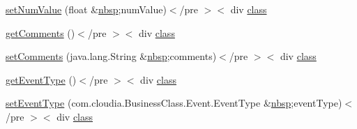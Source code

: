 \begin{DoxyCompactItemize}
\item 
\hyperlink{_event_8html_a67d82def639db0739032e4544a57afee}{set\-Num\-Value} (float \&\hyperlink{_tools_8html_aef915316f784c9063d942974538301a6}{nbsp};num\-Value)$<$/pre $>$$<$ div \hyperlink{_tools_8html_acf06f836132665ba8114f5a414c2403f}{class}
\item 
\hyperlink{_event_8html_a91fa52adf744ddd6011f742b741b39b0}{get\-Comments} ()$<$/pre $>$$<$ div \hyperlink{_tools_8html_acf06f836132665ba8114f5a414c2403f}{class}
\item 
\hyperlink{_event_8html_a2f2d0fa9f6c9af1541d87fb6f15daa53}{set\-Comments} (java.\-lang.\-String \&\hyperlink{_tools_8html_aef915316f784c9063d942974538301a6}{nbsp};comments)$<$/pre $>$$<$ div \hyperlink{_tools_8html_acf06f836132665ba8114f5a414c2403f}{class}
\item 
\hyperlink{_event_8html_aba480e20a8368ea9ff9ce67becdbccea}{get\-Event\-Type} ()$<$/pre $>$$<$ div \hyperlink{_tools_8html_acf06f836132665ba8114f5a414c2403f}{class}
\item 
\hyperlink{_event_8html_ae0c5585b2c61ab1f1a809103fde88e0a}{set\-Event\-Type} (com.\-cloudia.\-Business\-Class.\-Event.\-Event\-Type \&\hyperlink{_tools_8html_aef915316f784c9063d942974538301a6}{nbsp};event\-Type)$<$/pre $>$$<$ div \hyperlink{_tools_8html_acf06f836132665ba8114f5a414c2403f}{class}
\end{DoxyCompactItemize}

